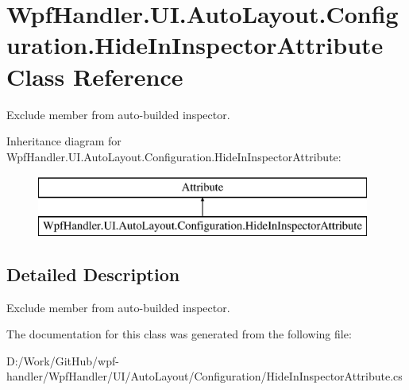 \hypertarget{class_wpf_handler_1_1_u_i_1_1_auto_layout_1_1_configuration_1_1_hide_in_inspector_attribute}{}\section{Wpf\+Handler.\+U\+I.\+Auto\+Layout.\+Configuration.\+Hide\+In\+Inspector\+Attribute Class Reference}
\label{class_wpf_handler_1_1_u_i_1_1_auto_layout_1_1_configuration_1_1_hide_in_inspector_attribute}


Exclude member from auto-\/builded inspector.  


Inheritance diagram for Wpf\+Handler.\+U\+I.\+Auto\+Layout.\+Configuration.\+Hide\+In\+Inspector\+Attribute\+:\begin{figure}[H]
\begin{center}
\leavevmode
\includegraphics[height=2.000000cm]{d4/d91/class_wpf_handler_1_1_u_i_1_1_auto_layout_1_1_configuration_1_1_hide_in_inspector_attribute}
\end{center}
\end{figure}


\subsection{Detailed Description}
Exclude member from auto-\/builded inspector. 



The documentation for this class was generated from the following file\+:\begin{DoxyCompactItemize}
\item 
D\+:/\+Work/\+Git\+Hub/wpf-\/handler/\+Wpf\+Handler/\+U\+I/\+Auto\+Layout/\+Configuration/Hide\+In\+Inspector\+Attribute.\+cs\end{DoxyCompactItemize}
